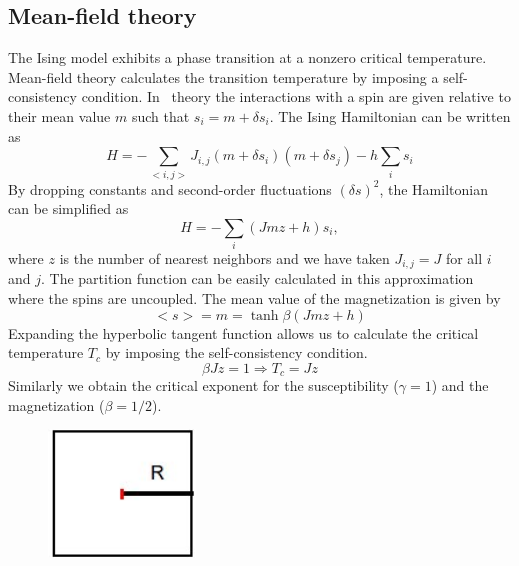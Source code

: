 \subsection{Mean-field theory}
The Ising model exhibits a phase transition at a nonzero critical temperature. Mean-field theory calculates  the transition temperature by imposing a self-consistency condition. In  \mf\ theory the interactions with a spin are given relative to their mean value $m$ such that $s_i = m+\delta s_i$. The Ising Hamiltonian can be written as %
\begin{equation}
	\label{eq:ising2}
	H = -\sum_{{<}i,j{{>}}} J_{i,j} (m+\delta s_i) (m+\delta s_j) - h \sum_i s_i 
\end{equation}%
By dropping constants and second-order fluctuations $(\delta s)^2$, the Hamiltonian can be simplified as
\begin{equation}
	\label{eq:ising2_2}
	H = -\sum_{i} (Jmz+h)  s_i,
\end{equation}%
where $z$ is the number of nearest neighbors and we have taken $J_{i,j}=J$ for all $i$ and $j$. The partition function can be easily calculated in this approximation where the spins are uncoupled. The mean value of the magnetization is given by
\begin{equation}
	\label{eq:ising3}
	{<}s{{>}} = m = \tanh \beta(Jmz+h) 
\end{equation}%
Expanding the hyperbolic tangent function allows us to calculate the critical temperature $T_c$ by imposing the self-consistency condition.%
\begin{equation}
	\label{eq:isingtc}
	\beta Jz = 1 \Rightarrow T_c = Jz  
\end{equation}%
Similarly we obtain the critical exponent for the susceptibility ($\gamma=1$) and the magnetization ($\beta=1/2$).%
\begin{figure}[!h]
	\centering
	\includegraphics[width=0.35\textwidth]{Images/interbox.png}
	\label{fig:interaction}
\end{figure}%

